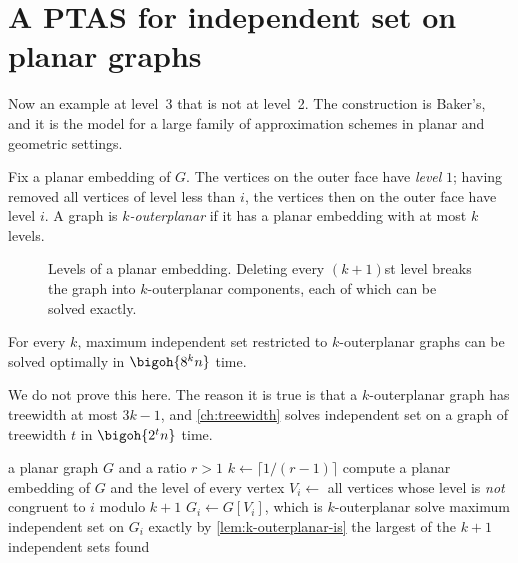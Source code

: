 \section{A PTAS for independent set on planar graphs}
\label{sec:ptas-planar-is}

Now an example at level~3 that is not at level~2. The construction is Baker's,
and it is the model for a large family of approximation schemes in planar and
geometric settings.

\begin{definition}\label{def:k-outerplanar}
Fix a planar embedding of $G$. The vertices on the outer face have \emph{level}
$1$; having removed all vertices of level less than $i$, the vertices then on
the outer face have level $i$. A graph is \emph{$k$-outerplanar} if it has a
planar embedding with at most $k$ levels.
\end{definition}

\begin{figure}[ht]
\centering
{}
\caption{Levels of a planar embedding. Deleting every $(k+1)$st level breaks the
graph into $k$-outerplanar components, each of which can be solved exactly.}
\label{fig:planar-levels}
\end{figure}

\begin{lemma}\label{lem:k-outerplanar-is}
For every $k$, maximum independent set restricted to $k$-outerplanar graphs can
be solved optimally in $\bigoh{8^k n}$ time.
\end{lemma}

We do not prove this here. The reason it is true is that a $k$-outerplanar graph
has treewidth at most $3k-1$, and \cref{ch:treewidth} solves independent set on
a graph of treewidth $t$ in $\bigoh{2^t n}$ time.

\begin{algorithm}[ht]
\caption{PTAS for maximum independent set on planar graphs}
\label{alg:planar-is-ptas}
\begin{algorithmic}[1]
  \Require a planar graph $G$ and a ratio $r > 1$
  \State $k \gets \lceil 1/(r-1) \rceil$
  \State compute a planar embedding of $G$ and the level of every vertex
    \State $V_i \gets$ all vertices whose level is \emph{not} congruent to $i$
           modulo $k+1$
    \State $G_i \gets G[V_i]$, which is $k$-outerplanar
    \State solve maximum independent set on $G_i$ exactly by
           \cref{lem:k-outerplanar-is}
  \EndFor
  \State \Return the largest of the $k+1$ independent sets found
\end{algorithmic}
\end{algorithm}

